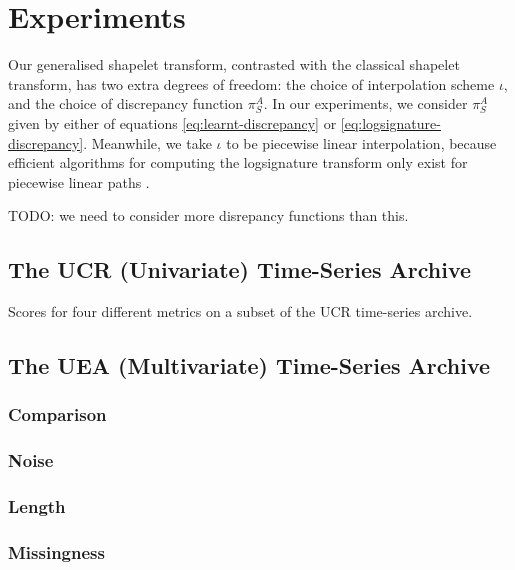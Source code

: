 \section{Experiments}
Our generalised shapelet transform, contrasted with the classical shapelet transform, has two extra degrees of freedom: the choice of interpolation scheme $\iota$, and the choice of discrepancy function $\pi^A_S$. In our experiments, we consider $\pi^A_S$ given by either of equations \eqref{eq:learnt-discrepancy} or \eqref{eq:logsignature-discrepancy}. Meanwhile, we take $\iota$ to be piecewise linear interpolation, because efficient algorithms for computing the logsignature transform only exist for piecewise linear paths \cite{signatory}.

TODO: we need to consider more disrepancy functions than this.

\subsection{The UCR (Univariate) Time-Series Archive}

\begin{table}[ht]
    \caption{Scores for four different metrics on a subset of the UCR time-series archive.}
    \label{tab:ucr_results}
    \centering
    
\end{table}


\subsection{The UEA (Multivariate) Time-Series Archive}

\subsubsection{Comparison}
\begin{table}[ht]
    \centering
    \caption{}
    \label{tab:uea_comparison_results}
    
\end{table}

\subsubsection{Noise}
\begin{table}[ht]
    \caption{}
    \label{tab:uea_noise}
    \centering
    
\end{table}

\subsubsection{Length}
\begin{table}[ht]
    \caption{}
    \label{tab:uea_length}
    \centering
    
\end{table}

\subsubsection{Missingness}
\begin{table}[ht]
    \caption{}
    \label{tab:uea_missingness}
    \centering
    
\end{table}
